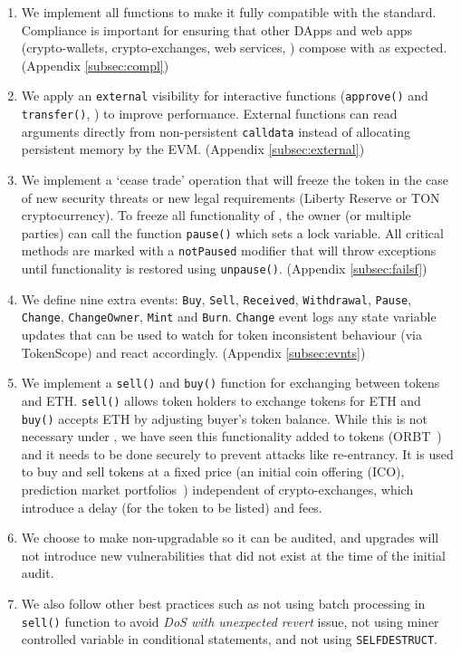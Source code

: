 \begin{enumerate}[noitemsep,topsep=0pt]
	\item We implement all \erc functions to make it fully compatible with the standard. Compliance is important for ensuring that other DApps and web apps (\ie crypto-wallets, crypto-exchanges, web services, \etc) compose with \sys as expected. (\cf Appendix \ref{subsec:compl})

	\item We apply an \texttt{external} visibility for interactive functions (\eg \texttt{approve()} and \texttt{transfer()}, \etc) to improve performance.  External functions can read arguments directly from non-persistent \texttt{calldata} instead of allocating persistent memory by the EVM. (\cf Appendix \ref{subsec:external})

	\item We implement a `cease trade' operation that will freeze the token in the case of new security threats or new legal requirements (\eg Liberty Reserve \cite{LibertyReserve} or TON cryptocurrency\cite{TON}). To freeze all functionality of \sys, the owner (or multiple parties) can call the function \texttt{pause()} which sets a lock variable. All critical methods are marked with a \texttt{notPaused} modifier that will throw exceptions until functionality is restored using \texttt{unpause()}. (\cf Appendix \ref{subsec:failsf})

	\item We define nine extra events: \texttt{Buy}, \texttt{Sell}, \texttt{Received}, \texttt{Withdrawal}, \texttt{Pause}, \texttt{Change}, \texttt{ChangeOwner}, \texttt{Mint} and \texttt{Burn}. \texttt{Change} event logs any state variable updates that can be used to watch for token inconsistent behaviour (\eg via TokenScope\cite{TokenScope}) and react accordingly. (\cf Appendix \ref{subsec:evnts})
	
	\item We implement a \texttt{sell()} and \texttt{buy()} function for exchanging between tokens and ETH. \texttt{sell()} allows token holders to exchange tokens for ETH and \texttt{buy()} accepts ETH by adjusting buyer's token balance. While this is not necessary under \erc, we have seen this functionality added to tokens (\eg ORBT~\cite{ORBTToken}) and it needs to be done securely to prevent attacks like re-entrancy. It is used to buy and sell tokens at a fixed price (\eg an initial coin offering (ICO), prediction market portfolios~\cite{CBN+14}) independent of crypto-exchanges, which introduce a delay (for the token to be listed) and fees.
	
	\item We choose to make \sys non-upgradable so it can be audited, and upgrades will not introduce new vulnerabilities that did not exist at the time of the initial audit.
	
	\item We also follow other best practices such as not using batch processing in \texttt{sell()} function to avoid \textit{DoS with unexpected revert} issue, not using miner controlled variable in conditional statements, and not using \texttt{SELFDESTRUCT}.
	
\end{enumerate}

